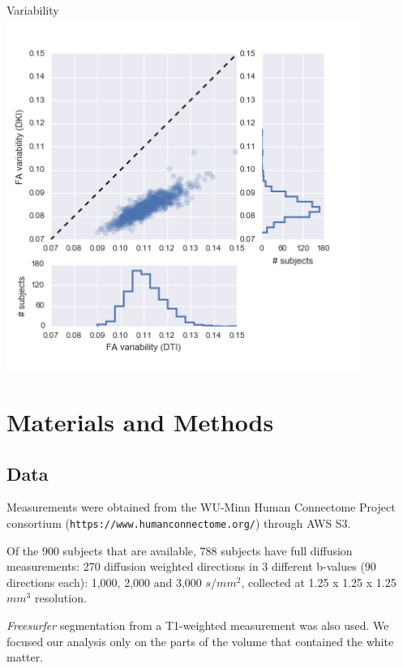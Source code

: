 \documentclass[a0, landscape]{a0poster}
\begin{document}
\begin{multicols}{3}
\begin{minipage}[b]{1\linewidth}
\begin{minipage}[b]{0.33\linewidth}
  \end{minipage}
  \begin{minipage}[b]{0.33\linewidth}
    \center Variability\\
  \includegraphics[width=11.5cm]{fa_spread.png}
  \end{minipage}
\end{minipage}

\normalsize
\section*{Materials and Methods}
\vspace{-10mm}
\subsection*{Data}
Measurements were obtained from the WU-Minn Human Connectome Project consortium
(\texttt{https://www.humanconnectome.org/}) through AWS S3.

\noindent Of the 900 subjects that are available, 788 subjects have full
diffusion measurements: 270 diffusion weighted directions in 3 different
b-values (90 directions each): 1,000, 2,000 and 3,000 $s/mm^2$, collected at
1.25 x 1.25 x 1.25 $mm^3$ resolution.

\noindent \emph{Freesurfer} segmentation from a T1-weighted measurement was also
used. We focused our analysis only on the parts of the volume that contained the
white matter. \vspace{-10mm}



\end{multicols}
\end{document}
